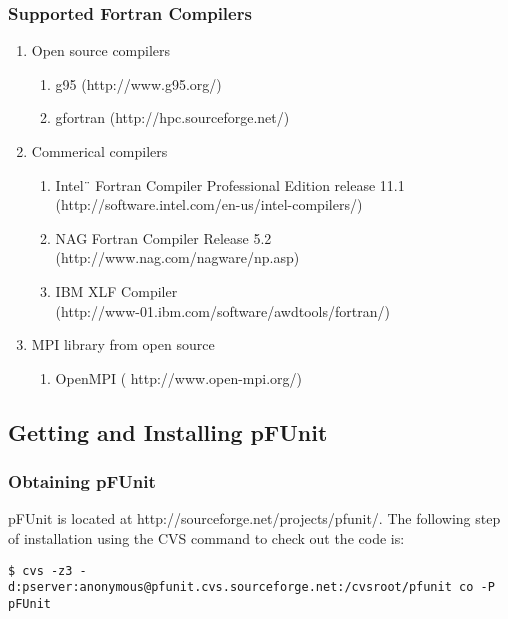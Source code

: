 \documentclass[10pt]{article}
\newcommand{\pfunit}{{\sc pFUnit }}
\begin{document}
\subsubsection{Supported Fortran Compilers}

\begin{enumerate}
	\item Open source compilers
	\begin{enumerate}
		 \item g95 (http://www.g95.org/)
		 \item gfortran (http://hpc.sourceforge.net/)
	\end{enumerate}
	
	\item Commerical compilers
	\begin{enumerate}
		 \item Intel¨ Fortran Compiler Professional Edition release 11.1 \\
			(http://software.intel.com/en-us/intel-compilers/)
		 \item NAG Fortran Compiler Release 5.2 \\
			(http://www.nag.com/nagware/np.asp)
		 \item IBM XLF Compiler \\
			(http://www-01.ibm.com/software/awdtools/fortran/)
	\end{enumerate}

	\item MPI library from open source
	\begin{enumerate}
		 \item OpenMPI ( http://www.open-mpi.org/) 
	\end{enumerate}
\end{enumerate}

\subsection{Getting and Installing \pfunit}
\subsubsection{Obtaining \pfunit}

\pfunit is located at http://sourceforge.net/projects/pfunit/.   The following step of installation 
using the CVS command to check out the code is:\\


\begin{verbatim}
$ cvs -z3 -d:pserver:anonymous@pfunit.cvs.sourceforge.net:/cvsroot/pfunit co -P pFUnit
\end{verbatim}
\end{document}
